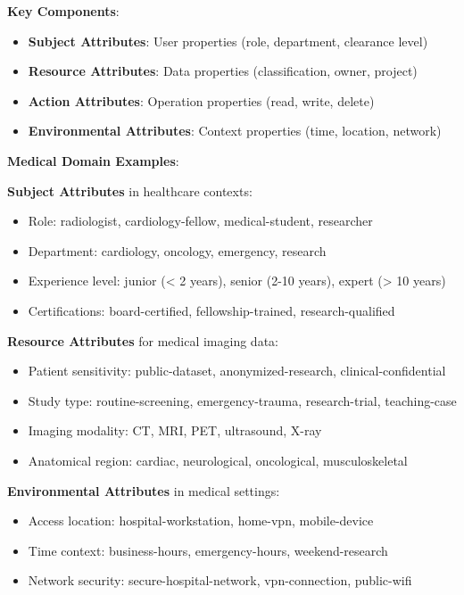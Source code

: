 \textbf{Key Components}:
\begin{itemize}
    \item \textbf{Subject Attributes}: User properties (role, department, clearance level)
    \item \textbf{Resource Attributes}: Data properties (classification, owner, project)
    \item \textbf{Action Attributes}: Operation properties (read, write, delete)
    \item \textbf{Environmental Attributes}: Context properties (time, location, network)
\end{itemize}

\textbf{Medical Domain Examples}:

\textbf{Subject Attributes} in healthcare contexts:
\begin{itemize}
    \item Role: radiologist, cardiology-fellow, medical-student, researcher
    \item Department: cardiology, oncology, emergency, research
    \item Experience level: junior (< 2 years), senior (2-10 years), expert (> 10 years)
    \item Certifications: board-certified, fellowship-trained, research-qualified
\end{itemize}

\textbf{Resource Attributes} for medical imaging data:
\begin{itemize}
    \item Patient sensitivity: public-dataset, anonymized-research, clinical-confidential
    \item Study type: routine-screening, emergency-trauma, research-trial, teaching-case
    \item Imaging modality: CT, MRI, PET, ultrasound, X-ray
    \item Anatomical region: cardiac, neurological, oncological, musculoskeletal
\end{itemize}

\textbf{Environmental Attributes} in medical settings:
\begin{itemize}
    \item Access location: hospital-workstation, home-vpn, mobile-device
    \item Time context: business-hours, emergency-hours, weekend-research
    \item Network security: secure-hospital-network, vpn-connection, public-wifi
\end{itemize}


